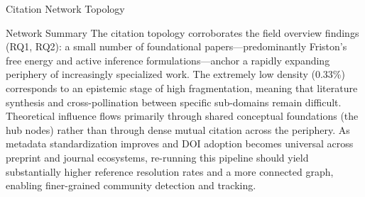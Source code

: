 \documentclass[
  ignorenonframetext,
]{beamer}
\begin{document}
\begin{frame}[allowframebreaks]{Citation Network Topology
\label{sec:citation_network}}
\begin{block}{Network Summary}
The citation topology corroborates the field overview findings (RQ1,
RQ2): a small number of foundational papers---predominantly Friston's
free energy and active inference formulations---anchor a rapidly
expanding periphery of increasingly specialized work. The extremely low
density (0.33\%) corresponds to an epistemic stage of high
fragmentation, meaning that literature synthesis and cross-pollination
between specific sub-domains remain difficult. Theoretical influence
flows primarily through shared conceptual foundations (the hub nodes)
rather than through dense mutual citation across the periphery. As
metadata standardization improves and DOI adoption becomes universal
across preprint and journal ecosystems, re-running this pipeline should
yield substantially higher reference resolution rates and a more
connected graph, enabling finer-grained community detection and
tracking.
\end{block}
\end{frame}
\end{document}
